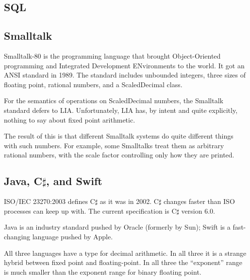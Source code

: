 \documentclass{article}
\begin{document}
\subsection{SQL}
\subsection{Smalltalk}

Smalltalk-80 is the programming language that brought Object-Oriented
programming and Integrated Development ENvironments to the world.
It got an ANSI standard in 1989.  The standard includes unbounded
integers, three sizes of floating point, rational numbers, and
a ScaledDecimal class.

For the semantics of operations on ScaledDecimal numbers,
the Smalltalk standard defers to LIA.  Unfortunately, LIA has,
by intent and quite explicitly, nothing to say about fixed point
arithmetic.

The result of this is that different Smalltalk systems do quite
different things with such numbers.  For example, some Smalltalks
treat them as arbitrary rational numbers, with the scale factor
controlling only how they are printed.

\subsection{Java, C$\sharp$, and Swift}

ISO/IEC 23270:2003 defines C$\sharp$ as it was in 2002.
C$\sharp$ changes faster than ISO processes can keep up with.
The current specification is C$\sharp$ version 6.0.

Java is an industry standard pushed by Oracle (formerly by Sun);
Swift is a fast-changing language pushed by Apple.

All three languages have a type for decimal arithmetic.
In all three it is a strange hybrid between fixed point
and floating-point.  In all three the ``exponent'' range is
much smaller than the exponent range for binary floating point.
\end{document}
